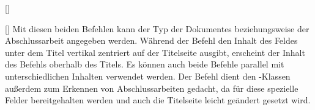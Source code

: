 \begin{Declaration*}{}
\begin{Declaration*}{}
\begin{Declaration*}{}
\begin{Declaration}{[]}
\begin{Declaration}{[]}
\printdeclarationlist%
%
%
%
Mit diesen beiden Befehlen kann der Typ der Dokumentes beziehungsweise der 
Abschlussarbeit angegeben werden. Während der Befehl  den Inhalt 
des Feldes unter dem Titel vertikal zentriert auf der Titelseite ausgibt, 
erscheint der Inhalt des Befehls  oberhalb des Titels. Es können 
auch beide Befehle parallel mit unterschiedlichen Inhalten verwendet werden. 
Der Befehl  dient den \TUDScript-Klassen außerdem zum Erkennen 
von Abschlussarbeiten gedacht, da für diese spezielle Felder bereitgehalten 
werden und auch die Titelseite leicht geändert gesetzt wird.


\end{Declaration}
\end{Declaration}
\end{Declaration*}
\end{Declaration*}
\end{Declaration*}
